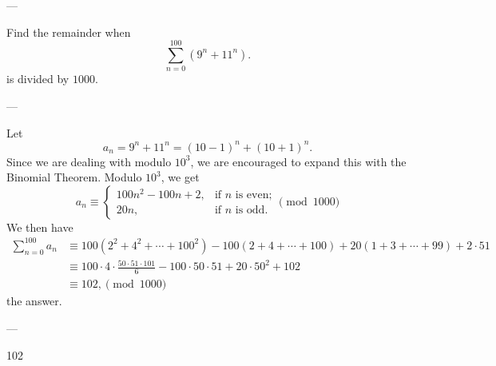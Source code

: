 
---

Find the remainder when \[\sum_{n=0}^{100}(9^n+11^n).\]
is divided by $1000$. 

---

Let \[a_n=9^n+11^n=(10-1)^n+(10+1)^n.\]
Since we are dealing with modulo $10^3$, we are encouraged to expand this with the Binomial Theorem. Modulo $10^3$, we get\[a_n\equiv\begin{cases}
100n^2-100n+2, &\text{if $n$ is even;}\\
20n, &\text{if $n$ is odd.}
\end{cases}\pmod{1000}\]
We then have
\begin{align*}
\sum_{n=0}^{100}a_n&\equiv 100\left(2^2+4^2+\cdots+100^2\right)-100(2+4+\cdots+100)+20(1+3+\cdots+99)+2\cdot 51 \\
&\equiv 100\cdot 4\cdot\frac{50\cdot 51\cdot 101}{6}-100\cdot 50\cdot 51+20\cdot 50^2+102\\
&\equiv 102,\pmod{1000}
\end{align*}
the answer.

---

102
